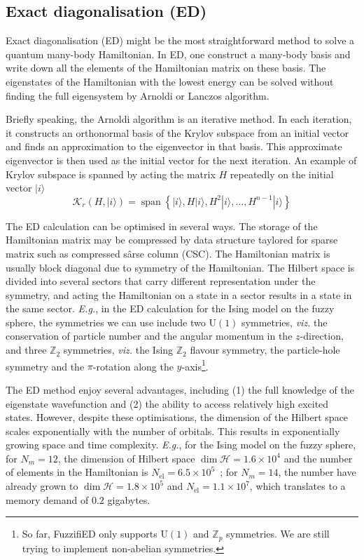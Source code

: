 \documentclass{timesjhep}
\begin{document}
\subsection{Exact diagonalisation (ED)}

Exact diagonalisation (ED) might be the most straightforward method to solve a quantum many-body Hamiltonian. In ED, one construct a many-body basis and write down all the elements of the Hamiltonian matrix on these basis. The eigenstates of the Hamiltonian with the lowest energy can be solved without finding the full eigensystem by Arnoldi or Lanczos algorithm. 

Briefly speaking, the Arnoldi algorithm is an iterative method. In each iteration, it constructs an orthonormal basis of the Krylov subspace from an initial vector and finds an approximation to the eigenvector in that basis. This approximate eigenvector is then used as the initial vector for the next iteration. An example of Krylov subspace is spanned by acting the matrix $H$ repeatedly on the initial vector $|i\rangle$
\begin{equation}
    \mathcal{K}_r(H,|i\rangle)=\operatorname{span}\left\{|i\rangle,H|i\rangle,H^2|i\rangle,\dots,H^{n-1}|i\rangle\right\}
\end{equation}

The ED calculation can be optimised in several ways. The storage of the Hamiltonian matrix may be compressed by data structure taylored for sparse matrix such as compressed sârse column (CSC). The Hamiltonian matrix is usually block diagonal due to symmetry of the Hamiltonian. The Hilbert space is divided into several sectors that carry different representation under the symmetry, and acting the Hamiltonian on a state in a sector results in a state in the same sector. \textit{E.g.}, in the ED calculation for the Ising model on the fuzzy sphere, the symmetries we can use include two $\mathrm{U}(1)$ symmetries, \textit{viz.} the conservation of particle number and the angular momentum in the $z$-direction, and three $\mathbb{Z}_2$ symmetries, \textit{viz.} the Ising $\mathbb{Z}_2$ flavour symmetry, the particle-hole symmetry and the $\pi$-rotation along the $y$-axis\footnote{So far, FuzzifiED only supports $\mathrm{U}(1)$ and $\mathbb{Z}_p$ symmetries. We are still trying to implement non-abelian symmetries.}.

The ED method enjoy several advantages, including (1) the full knowledge of the eigenstate wavefunction and (2) the ability to access relatively high excited states. However, despite these optimisations, the dimension of the Hilbert space scales exponentially with the number of orbitals. This results in exponentially growing space and time complexity. \textit{E.g.}, for the Ising model on the fuzzy sphere, for $N_m=12$, the dimension of Hilbert space $\dim\mathcal{H}=1.6\times10^4$ and the number of elements in the Hamiltonian is $N_
\mathrm{el}=6.5\times 10^5$~; for $N_m=14$, the number have already grown to $\dim\mathcal{H}=1.8\times10^5$ and $N_\textrm{el}=1.1\times 10^7$, which translates to a memory demand of $0.2$ gigabytes. 
\end{document}

